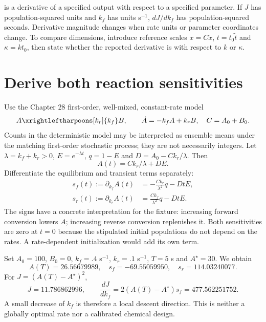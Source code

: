  is a derivative of a specified output with respect to a specified
parameter. If $J$ has population-squared units and $k_f$ has units s$^{-1}$,
$dJ/dk_f$ has population-squared seconds. Derivative magnitude changes when rate
units or parameter coordinates change. To compare dimensions, introduce reference
scales $x=C\tilde x$, $t=t_0\tilde t$ and $\kappa=k t_0$, then state whether
the reported derivative is with respect to $k$ or $\kappa$.

\section{Derive both reaction sensitivities}
Use the Chapter 28 first-order, well-mixed, constant-rate model
\[
 A\xrightleftharpoons[k_r]{k_f}B,\qquad
 \dot A=-k_f A+k_r B,\quad C=A_0+B_0.
\]
Counts in the deterministic model may be interpreted as ensemble means under
the matching first-order stochastic process; they are not necessarily integers.
Let $\lambda=k_f+k_r>0$, $E=e^{-\lambda t}$,
$q=1-E$ and $D=A_0-Ck_r/\lambda$. Then
\[
 A(t)=Ck_r/\lambda+D E.
\]
Differentiate the equilibrium and transient terms separately:
\begin{align}
 s_f(t):=\partial_{k_f}A(t)&=-\frac{Ck_r}{\lambda^2}q-DtE,\\
 s_r(t):=\partial_{k_r}A(t)&=\frac{Ck_f}{\lambda^2}q-DtE.
\end{align}
The signs have a concrete interpretation for the fixture: increasing forward
conversion lowers $A$; increasing reverse conversion replenishes it.
Both sensitivities are zero at $t=0$ because the stipulated initial populations
do not depend on the rates. A rate-dependent initialization would add its own term.

Set $A_0=100$, $B_0=0$, $k_f=.4$ s$^{-1}$, $k_r=.1$ s$^{-1}$,
$T=5$ s and $A^\star=30$. We obtain
\[
 A(T)=26.56679989,\quad s_f=-69.55059950,\quad s_r=114.03240077.
\]
For $J=(A(T)-A^\star)^2$,
\[
 J=11.786862996,\qquad
 \frac{dJ}{dk_f}=2(A(T)-A^\star)s_f=477.562251752.
\]
A small decrease of $k_f$ is therefore a local descent direction. This is neither
a globally optimal rate nor a calibrated chemical design.


